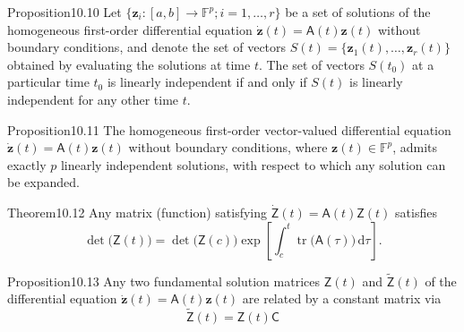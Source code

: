 \begin{res}{Proposition}{10.10}
Let $\{\boldsymbol z_i:[a,b]\to\mathbb F^p;i=1,\dots,r\}$ be a set of solutions of the homogeneous first-order differential equation $\dot{\boldsymbol z}(t)=\mathsf A(t)\boldsymbol z(t)$ without boundary conditions, and denote the set of vectors $S(t)=\{\boldsymbol z_1(t),\dots,\boldsymbol z_r(t)\}$ obtained by evaluating the solutions at time $t$. The set of vectors $S(t_0)$ at a particular time $t_0$ is linearly independent if and only if $S(t)$ is linearly independent for any other time $t$.
\end{res}

\begin{res}{Proposition}{10.11}
The homogeneous first-order vector-valued differential equation $\dot{\boldsymbol z}(t)=\mathsf A(t)\boldsymbol z(t)$ without boundary conditions, where $\boldsymbol z(t)\in\mathbb F^p$, admits exactly $p$ linearly independent solutions, with respect to which any solution can be expanded.
\end{res}

\begin{res}[Liouville]{Theorem}{10.12}
Any matrix (function) satisfying $\dot{\mathsf Z}(t)=\mathsf A(t)\mathsf Z(t)$ satisfies
\begin{equation}\det\bigl(\mathsf Z(t)\bigr)=\det\bigl(\mathsf Z(c)\bigr)\exp\left[\int_c^t\operatorname{tr}\bigl(\mathsf A(\tau)\bigr)\,\mathrm d\tau\right].\tag{10.57}\end{equation}
\end{res}

\begin{res}{Proposition}{10.13}
Any two fundamental solution matrices $\mathsf Z(t)$ and $\tilde{\mathsf Z}(t)$ of the differential equation $\dot{\boldsymbol z}(t)=\mathsf A(t)\boldsymbol z(t)$ are related by a constant matrix via
\begin{equation}\tilde{\mathsf Z}(t)=\mathsf Z(t)\mathsf C\tag{10.60}\end{equation}
\end{res}

